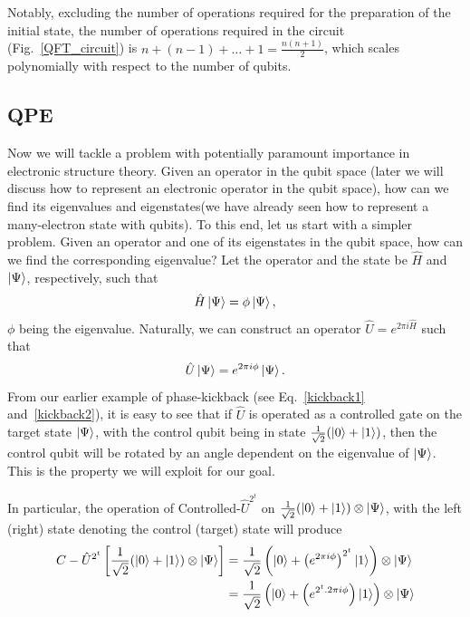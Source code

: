 \documentclass[12pt,oneside]{book}
\begin{document}
Notably, excluding the number of operations required for the preparation of the initial state, the number of operations required in the circuit (Fig.~\ref{QFT_circuit}) is $n + (n-1) + \hdots + 1=\frac{n(n+1)}{2}$, which scales polynomially with respect to the number of qubits.

\subsection*{QPE}

Now we will tackle a problem with potentially paramount importance in electronic structure theory. Given an operator in the qubit space (later we will discuss how to represent an electronic operator in the qubit space), how can we find its eigenvalues and eigenstates(we have already seen how to represent a many-electron state with qubits).
%
To this end, let us start with a simpler problem.
%
Given an operator and one of its eigenstates in the qubit space, how can we find the corresponding eigenvalue?
%
Let the operator and the state be $\hat{H}$ and $\ket{\Psi}$, respectively, such that 
\begin{align}
    \hat{H}\ket{\Psi}=\phi\ket{\Psi},
\end{align}
$\phi$ being the eigenvalue. Naturally, we can construct an operator $\hat{U}=e^{2\pi i \hat{H}}$ such that
\begin{align}
    \hat{U}\ket{\Psi}=e^{2\pi i \phi}\ket{\Psi}.
\end{align}
From our earlier example of phase-kickback (see Eq.~\ref{kickback1} and~\ref{kickback2}), it is easy to see that if $\hat{U}$ is operated as a controlled gate on the target state $\ket{\Psi}$, with the control qubit being in state $\frac{1}{\sqrt{2}}(\ket{0}+\ket{1})$, then the control qubit will be rotated by an angle dependent on the eigenvalue of $\ket{\Psi}$. This is the property we will exploit for our goal.

In particular, the operation of Controlled-$\hat{U}^{2^t}$ on $\frac{1}{\sqrt{2}}(\ket{0}+\ket{1}) \otimes \ket{\Psi}$, with the left (right) state denoting the control (target) state will produce
\begin{align*}
    C-\hat{U}^{2^t} \left[\frac{1}{\sqrt{2}}(\ket{0}+\ket{1}) \otimes \ket{\Psi}\right] &{} = \frac{1}{\sqrt{2}}\left(\ket{0}+\left(e^{2\pi i \phi}\right)^{2^t}\ket{1}\right) \otimes \ket{\Psi}\\
    &{} = \frac{1}{\sqrt{2}}\left(\ket{0}+\left(e^{2^t . 2\pi i \phi}\right)\ket{1}\right) \otimes \ket{\Psi}
\end{align*}
\end{document}
